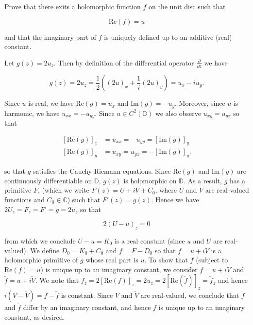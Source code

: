 Prove that there exits a holomorphic function $f$ on the unit disc such that

$$
\text{Re} (f) = u
$$

and that the imaginary part of $f$ is uniquely defined up to an additive (real) constant.

\begin{solution}
    Let $g(z) = 2 u_z$. Then by definition of the differential operator $\frac{\partial}{\partial z}$ we have

    $$
    g(z) = 2 u_z = \frac{1}{2} \left((2u)_x + \frac{1}{i} (2u)_y \right) = u_x - i u_y.
    $$

    Since $u$ is real, we have $\text{Re}(g) = u_x$ and $\text{Im}(g) = -u_y$. Moreover, since $u$ is harmonic, we have
    $u_{xx} = -u_{yy}$. Since $u \in C^2(\mathbb{D})$ we also observe $u_{xy} = u_{yx}$ so that

    \begin{align*}
        \left[\text{Re}(g) \right]_x &= u_{xx} = -u_{yy} = \left[\text{Im}(g) \right]_y \\
        \left[\text{Re}(g) \right]_y &= u_{xy} = u_{yx} = - \left[\text{Im}(g) \right]_y.
    \end{align*}
    
    so that $g$ satisfies the Cauchy-Riemann equations. Since $\text{Re}(g)$ and $\text{Im}(g)$ are continuously 
    differentiable on $\mathbb{D}$, $g(z)$ is holomorphic on $\mathbb{D}$. As a result, $g$ has a primitive $F$, 
    (which we write $F(z) = U + i V + C_0$, where $U$ and $V$ are real-valued functions and $C_0 \in \mathbb{C}$) such
    that $F'(z) = g(z)$. Hence we have $2 U_z = F_z = F' = g = 2 u_z$ so that

    $$
    2 \left(U - u \right)_z = 0
    $$

    from which we conclude $U - u = K_0$ is a real constant (since $u$ and $U$ are real-valued). We define 
    $D_0 = K_0 + C_0$ and $f = F - D_0$ so that $f = u + i V$ is a holomorphic primitive of $g$ whose real part is $u$. 
    To show that $f$ (subject to $\text{Re}(f) = u$) is unique up to an imaginary constant, we consider $f = u + i V$ 
    and $\tilde{f} = u + i \tilde{V}$. We note that 
    $f_z = 2 \left[ \text{Re}(f) \right]_z = 2u_z = 2 \left[ \text{Re}(\tilde{f}) \right]_z = \tilde{f}_z$ and hence
    $i (V - \tilde{V}) = f - \tilde{f}$ is constant. Since $V$ and $\tilde{V}$ are real-valued, we conclude that $f$ and
    $\tilde{f}$ differ by an imaginary constant, and hence $f$ is unique up to an imaginary constant, as desired.
    \ \\
\end{solution}